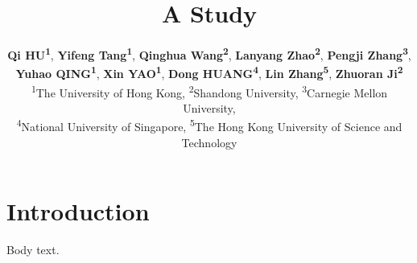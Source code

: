 \documentclass[11pt]{article}
\title{A Study}
\author{
  \textbf{Qi HU\textsuperscript{1}},
  \textbf{Yifeng Tang\textsuperscript{1}},
  \textbf{Qinghua Wang\textsuperscript{2}},
  \textbf{Lanyang Zhao\textsuperscript{2}},
  \textbf{Pengji Zhang\textsuperscript{3}},\\
  \textbf{Yuhao QING\textsuperscript{1}},
  \textbf{Xin YAO\textsuperscript{1}},
  \textbf{Dong HUANG\textsuperscript{4}},
  \textbf{Lin Zhang\textsuperscript{5}},
  \textbf{Zhuoran Ji\textsuperscript{2}}\\
  \normalfont
  \textsuperscript{1}The University of Hong Kong,
  \textsuperscript{2}Shandong University,
  \textsuperscript{3}Carnegie Mellon University,\\
  \textsuperscript{4}National University of Singapore,
  \textsuperscript{5}The Hong Kong University of Science and Technology
}
\begin{document}
\maketitle
\section{Introduction}
Body text.
\end{document}
